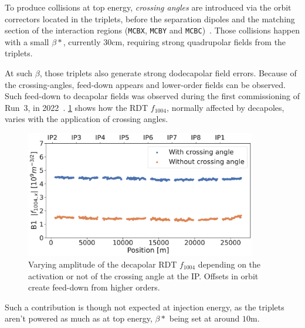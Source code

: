 To produce collisions at top energy, \textit{crossing angles} are introduced via the orbit
correctors located in the triplets, before the separation dipoles and the matching section of the
interaction regions (\texttt{MCBX}, \texttt{MCBY} and \texttt{MCBC})~\cite{de_maria_lhc_2008}. Those
collisions happen with a small $\beta*$, currently 30cm, requiring strong quadrupolar fields from
the triplets.

At such $\beta$, those triplets also generate strong dodecapolar field errors. Because of the
crossing-angles, feed-down appears and lower-order fields can be observed.
Such feed-down to decapolar fields was observed during the first commissioning of Run~3, in
2022~\cite{maclean_prospects_2022}.
\cref{fig:decapoles:f1004_from_feeddown} shows how the RDT $f_{1004}$, normally affected by
decapoles, varies with the application of crossing angles.

\begin{figure}[H]
    \centering
    \includegraphics[width=0.9\textwidth]{./images/f1004x_feed-down_b6_triplets.pdf}
    \caption{Varying amplitude of the decapolar RDT $f_{1004}$ depending on the activation or not of
    the crossing angle at the IP. Offsets in orbit create feed-down from higher orders.}
    \label{fig:decapoles:f1004_from_feeddown}
\end{figure}

Such a contribution is though not expected at injection energy, as the triplets aren't powered as
much as at top energy, $\beta*$ being set at around $10$m.

\subsection{}

